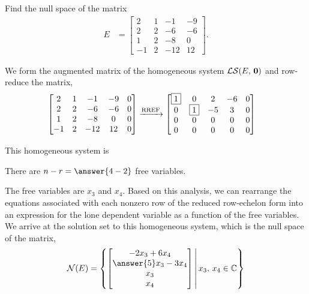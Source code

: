 \documentclass{ximera}
\begin{document}
\begin{exercise}
  Find the null space of the matrix
  \begin{align*}
    E&=
       \begin{bmatrix}
         2 & 1 & -1 & -9 \\
         2 & 2 & -6 & -6 \\
         1 & 2 & -8 & 0 \\
         -1 & 2 & -12 & 12
       \end{bmatrix}.
  \end{align*}
  
  We form the augmented matrix of the homogeneous system $\mathcal{LS}\!\left(E,\,\mathbf{0}\right)$ and row-reduce the matrix,
  \begin{align*}
    \begin{bmatrix}
      2 & 1 & -1 & -9 & 0 \\
      2 & 2 & -6 & -6 & 0 \\
      1 & 2 & -8 & 0 & 0 \\
      -1 & 2 & -12 & 12 & 0
    \end{bmatrix}
        &\xrightarrow{\text{RREF}}
          \begin{bmatrix}
            \fbox{1} & 0 & 2 & -6 & 0 \\
            0 & \fbox{1} & -5 & 3 & 0 \\
            0 & 0 & 0 & 0 & 0 \\
            0 & 0 & 0 & 0 & 0
          \end{bmatrix}
  \end{align*}

  This homogeneous system is 
  \begin{multipleChoice}
  \end{multipleChoice}

  There are $n-r=\answer{4-2}$ free variables.

  \begin{exercise}
    The free variables are $x_3$ and $x_4$.  Based on this analysis,
    we can rearrange the equations associated with each nonzero row of
    the reduced row-echelon form into an expression for the lone
    dependent variable as a function of the free variables.  We arrive
    at the solution set to this homogeneous system, which is the null
    space of the matrix,
    \begin{align*}
      \nsp{E}=\setparts{\colvector{-2x_3+6x_4\\\answer{5}x_3-3x_4\\x_3\\x_4}}{x_3,\,x_4\in\complexes}
    \end{align*}
  \end{exercise}
\end{exercise}
\end{document}
